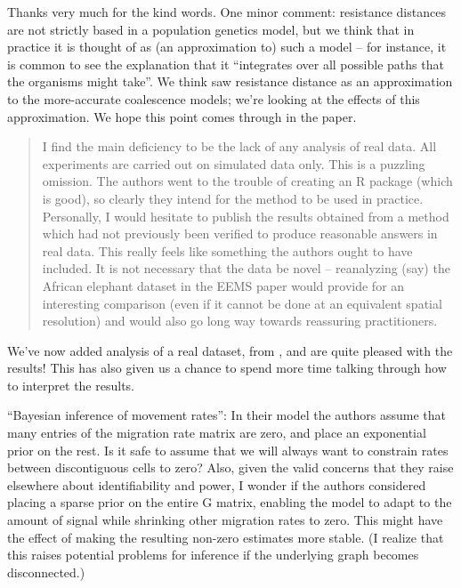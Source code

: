Thanks very much for the kind words.
One minor comment: resistance distances are not strictly based in a population genetics model,
but we think that in practice it is thought of as (an approximation to) such a model
-- for instance, it is common to see the explanation that it
``integrates over all possible paths that the organisms might take''.
We think \citet{mcrae2006isolation} saw resistance distance as an approximation
to the more-accurate coalescence models; we're looking at the effects of this approximation.
We hope this point comes through in the paper.


\begin{quote}
    I find the main deficiency to be the lack of any analysis of real data. All
    experiments are carried out on simulated data only. This is a puzzling omission.
    The authors went to the trouble of creating an R package (which is good), so
    clearly they intend for the method to be used in practice. Personally, I would
    hesitate to publish the results obtained from a method which had not previously
    been verified to produce reasonable answers in real data. This really feels like
    something the authors ought to have included. It is not necessary that the data
    be novel -- reanalyzing (say) the African elephant dataset in the EEMS paper
    would provide for an interesting comparison (even if it cannot be done at an
    equivalent spatial resolution) and would also go long way towards reassuring
    practitioners.
\end{quote}

We've now added analysis of a real dataset, from \citet{geraldes2014landscape},
and are quite pleased with the results!
This has also given us a chance to spend more time talking through how to interpret the results.


\begin{point}{}
    ``Bayesian inference of movement rates'': In their model the authors assume
    that many entries of the migration rate matrix are zero, and place an
    exponential prior on the rest. Is it safe to assume that we will always
    want to constrain rates between discontiguous cells to zero? Also, given
    the valid concerns that they raise elsewhere about identifiability and
    power, I wonder if the authors considered placing a sparse prior on the
    entire G matrix, enabling the model to adapt to the amount of signal while
    shrinking other migration rates to zero. This might have the effect of
    making the resulting non-zero estimates more stable. (I realize that this
    raises potential problems for inference if the underlying graph becomes
    disconnected.)
\end{point}


